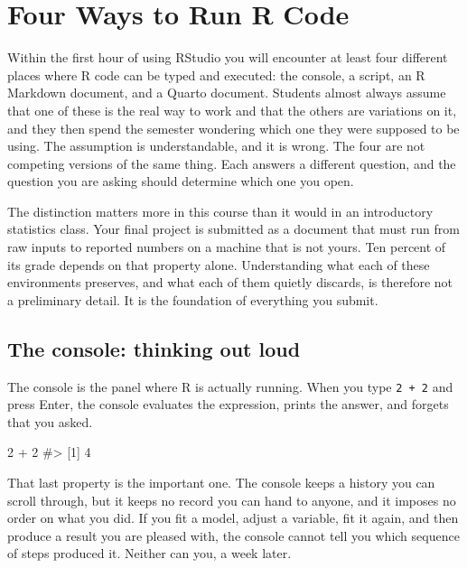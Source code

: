 \documentclass[
  a4paper,
]{scrbook}
\newenvironment{Shaded}{\begin{snugshade}}{\end{snugshade}}
\newcommand{\CommentTok}[1]{\textcolor[rgb]{0.37,0.37,0.37}{#1}}
\newcommand{\DecValTok}[1]{\textcolor[rgb]{0.68,0.00,0.00}{#1}}
\newcommand{\SpecialCharTok}[1]{\textcolor[rgb]{0.37,0.37,0.37}{#1}}
\begin{document}
\chapter*{Four Ways to Run R Code}\label{four-ways-to-run-r-code}


Within the first hour of using RStudio you will encounter at least four
different places where R code can be typed and executed: the console, a
script, an R Markdown document, and a Quarto document. Students almost
always assume that one of these is the real way to work and that the
others are variations on it, and they then spend the semester wondering
which one they were supposed to be using. The assumption is
understandable, and it is wrong. The four are not competing versions of
the same thing. Each answers a different question, and the question you
are asking should determine which one you open.

The distinction matters more in this course than it would in an
introductory statistics class. Your final project is submitted as a
document that must run from raw inputs to reported numbers on a machine
that is not yours. Ten percent of its grade depends on that property
alone. Understanding what each of these environments preserves, and what
each of them quietly discards, is therefore not a preliminary detail. It
is the foundation of everything you submit.

\section*{The console: thinking out
loud}\label{the-console-thinking-out-loud}


The console is the panel where R is actually running. When you type
\texttt{2\ +\ 2} and press Enter, the console evaluates the expression,
prints the answer, and forgets that you asked.

\begin{Shaded}
\begin{Highlighting}[]
\DecValTok{2} \SpecialCharTok{+} \DecValTok{2}
\CommentTok{\#\textgreater{} [1] 4}
\end{Highlighting}
\end{Shaded}

That last property is the important one. The console keeps a history you
can scroll through, but it keeps no record you can hand to anyone, and
it imposes no order on what you did. If you fit a model, adjust a
variable, fit it again, and then produce a result you are pleased with,
the console cannot tell you which sequence of steps produced it. Neither
can you, a week later.
\end{document}
